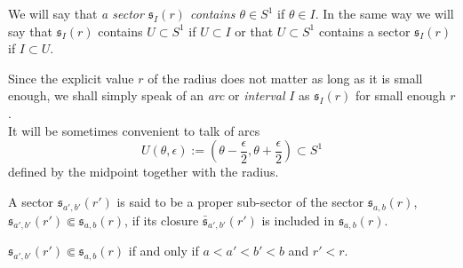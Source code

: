 \begin{defn}
  We will say that \emph{a sector $\mathfrak{s}_{I}(r)$ contains $\theta\in
  S^1$} if $\theta\in I$. In the same way we will say that $\mathfrak{s}_I(r)$
  contains $U\subset S^1$ if $U\subset I$ or that $U\subset S^1$ contains a
  sector $\mathfrak{s}_I(r)$ if $I\subset U$.
\end{defn}
\begin{rem}\label{rem:arcsByWidthAndCenter}
  Since the explicit value $r$ of the radius does not matter as long as it is
  small enough, we shall simply speak of an \emph{arc} or \emph{interval} $I$
  as $\mathfrak{s}_I(r)$ for small enough $r$.
  \\It will be sometimes convenient to talk of arcs
  \[
    U(\theta,\epsilon):=\left(\theta-\frac{\epsilon}{2}
    ,\theta+\frac{\epsilon}{2}\right)\subset S^1
  \]
  defined by the midpoint together with the radius.
\end{rem}
\begin{defn}
  A sector $\mathfrak{s}_{a',b'}(r')$ is said to be a proper sub-sector of the
  sector $\mathfrak{s}_{a,b}(r)$,
  $\mathfrak{s}_{a',b'}(r')\Subset\mathfrak{s}_{a,b}(r)$, if its closure
  $\bar{\mathfrak{s}}_{a',b'}(r')$ is included in $\mathfrak{s}_{a,b}(r)$.
  \begin{s-rem}
    $\mathfrak{s}_{a',b'}(r')\Subset\mathfrak{s}_{a,b}(r)$ if and only if
    $a<a'<b'<b$ and $r'<r$.
  \end{s-rem}
\end{defn}

